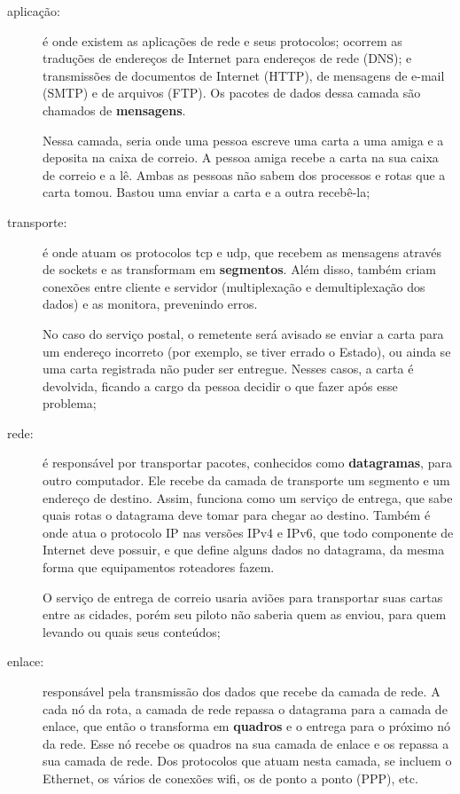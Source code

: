 \begin{description}
    \item[aplicação:] é onde existem as aplicações de rede e seus protocolos; ocorrem
        as traduções de endereços de Internet para endereços de rede (DNS); e
        transmissões de documentos de Internet (HTTP), de mensagens de e-mail (SMTP) e
        de arquivos (FTP). Os pacotes de dados dessa camada são chamados de
        \textbf{mensagens}.

        Nessa camada, seria onde uma pessoa escreve uma carta a uma amiga e a deposita
        na caixa de correio. A pessoa amiga recebe a carta na sua caixa de correio e a
        lê. Ambas as pessoas não sabem dos processos e rotas que a carta tomou. Bastou
        uma enviar a carta e a outra recebê-la;

    \item[transporte:] é onde atuam os protocolos \gls{tcp} e \gls{udp}, que recebem as mensagens através de \glspl{socket} e as transformam em \textbf{segmentos}. Além disso, também criam
        conexões entre cliente e servidor (multiplexação e demultiplexação dos dados)
        e as monitora, prevenindo erros.

        No caso do serviço postal, o remetente será avisado se enviar a carta para um
        endereço incorreto (por exemplo, se tiver errado o Estado), ou ainda se uma
        carta registrada não puder ser entregue. Nesses casos, a carta é devolvida,
        ficando a cargo da pessoa decidir o que fazer após esse problema;

    \item[rede:] é responsável por transportar pacotes, conhecidos como
        \textbf{datagramas}, para outro computador. Ele recebe da camada de transporte
        um segmento e um endereço de destino. Assim, funciona como um serviço de
        entrega, que sabe quais rotas o datagrama deve tomar para chegar ao destino.
        Também é onde atua o protocolo IP nas versões IPv4 e IPv6, que todo componente
        de Internet deve possuir, e que define alguns dados no datagrama, da mesma
        forma que equipamentos roteadores fazem.

        O serviço de entrega de correio usaria aviões para transportar suas cartas
        entre as cidades, porém seu piloto não saberia quem as enviou, para quem
        levando ou quais seus conteúdos;

    \item[enlace:] responsável pela transmissão dos dados que recebe da camada de rede.
        A cada nó da rota, a camada de rede repassa o datagrama para a camada de
        enlace, que então o transforma em \textbf{quadros} e o entrega para o próximo
        nó da rede. Esse nó recebe os quadros na sua camada de enlace e os repassa a
        sua camada de rede. Dos protocolos que atuam nesta camada, se incluem o
        Ethernet, os vários de conexões wifi, os de ponto a ponto (PPP), etc.


\end{description}
